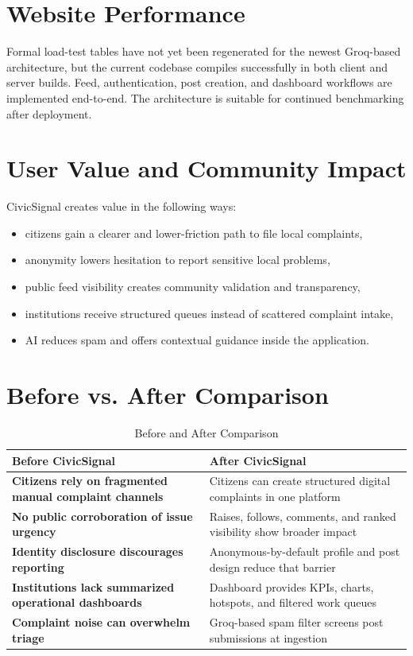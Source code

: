 \documentclass[12pt,a4paper]{report}
\begin{document}
\section{Website Performance}
Formal load-test tables have not yet been regenerated for the newest Groq-based architecture, but the current codebase compiles successfully in both client and server builds. Feed, authentication, post creation, and dashboard workflows are implemented end-to-end. The architecture is suitable for continued benchmarking after deployment.

\section{User Value and Community Impact}
CivicSignal creates value in the following ways:
\begin{itemize}
  \item citizens gain a clearer and lower-friction path to file local complaints,
  \item anonymity lowers hesitation to report sensitive local problems,
  \item public feed visibility creates community validation and transparency,
  \item institutions receive structured queues instead of scattered complaint intake,
  \item AI reduces spam and offers contextual guidance inside the application.
\end{itemize}

\section{Before vs. After Comparison}
\begin{table}[H]
\centering
\caption{Before and After Comparison}
\begin{tabularx}{\textwidth}{>{\bfseries}X X}
\toprule
Before CivicSignal & After CivicSignal \\
\midrule
Citizens rely on fragmented manual complaint channels & Citizens can create structured digital complaints in one platform \\
No public corroboration of issue urgency & Raises, follows, comments, and ranked visibility show broader impact \\
Identity disclosure discourages reporting & Anonymous-by-default profile and post design reduce that barrier \\
Institutions lack summarized operational dashboards & Dashboard provides KPIs, charts, hotspots, and filtered work queues \\
Complaint noise can overwhelm triage & Groq-based spam filter screens post submissions at ingestion \\
\bottomrule
\end{tabularx}
\end{table}
\end{document}

